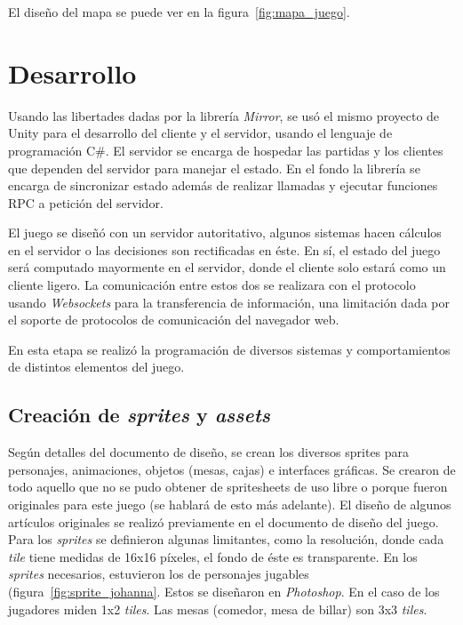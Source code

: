 El diseño del mapa se puede ver en la figura~\ref{fig:mapa_juego}.

\section{Desarrollo}
Usando las libertades dadas por la librería \textit{Mirror}, se usó el mismo proyecto de Unity para el desarrollo del cliente y el servidor, usando el lenguaje de programación C\#. El servidor se encarga de hospedar las partidas y los clientes que dependen del servidor para manejar el estado. En el fondo la librería se encarga de sincronizar estado además de realizar llamadas y ejecutar funciones RPC a petición del servidor.

El juego se diseñó con un servidor autoritativo, algunos sistemas hacen cálculos en el servidor o las decisiones son rectificadas en éste. En sí, el estado del juego será computado mayormente en el servidor, donde el cliente solo estará como un cliente ligero. La comunicación entre estos dos se realizara con el protocolo usando \textit{Websockets} para la transferencia de información, una limitación dada por el soporte de protocolos de comunicación del navegador web.

En esta etapa se realizó la programación de diversos sistemas y comportamientos de distintos elementos del juego.

\subsection{Creación de \textit{sprites} y \textit{assets}}
Según detalles del documento de diseño, se crean los diversos sprites para personajes, animaciones, objetos (mesas, cajas) e interfaces gráficas. Se crearon de todo aquello que no se pudo obtener de spritesheets de uso libre o porque fueron originales para este juego (se hablará de esto más adelante). El diseño de algunos artículos originales se realizó previamente en el documento de diseño del juego. Para los \textit{sprites} se definieron algunas limitantes, como la resolución, donde cada \textit{tile}  tiene medidas de 16x16 píxeles, el fondo de éste es transparente. En los \textit{sprites} necesarios, estuvieron los de personajes jugables (figura~\ref{fig:sprite_johanna}. Estos se diseñaron en \textit{Photoshop}. En el caso de los jugadores miden 1x2 \textit{tiles}. Las mesas (comedor, mesa de billar) son 3x3 \textit{tiles}. 

